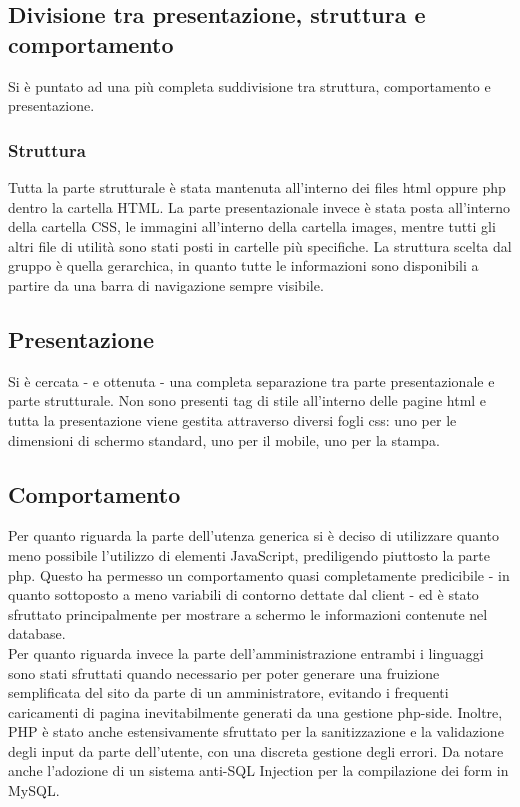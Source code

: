 \subsection{Divisione tra presentazione, struttura e comportamento}
Si è puntato ad una più completa suddivisione tra struttura, comportamento e presentazione.
\subsubsection{Struttura}
Tutta la parte strutturale è stata mantenuta all'interno dei files html oppure php dentro la cartella HTML. La parte presentazionale invece è stata posta all'interno della cartella CSS, le immagini all'interno della cartella images, mentre tutti gli altri file di utilità sono stati posti in cartelle più specifiche. La struttura scelta dal gruppo è quella gerarchica, in quanto tutte le informazioni sono disponibili a partire da una barra di navigazione sempre visibile.
\subsection{Presentazione}
Si è cercata - e ottenuta - una completa separazione tra parte presentazionale e parte strutturale. Non sono presenti tag di stile all'interno delle pagine html e tutta la presentazione viene gestita attraverso diversi fogli css: uno per le dimensioni di schermo standard, uno per il mobile, uno per la stampa.
\subsection{Comportamento}
Per quanto riguarda la parte dell'utenza generica si è deciso di utilizzare quanto meno possibile l'utilizzo di elementi JavaScript, prediligendo piuttosto la parte php. Questo ha permesso un comportamento quasi completamente predicibile - in quanto sottoposto a meno variabili di contorno dettate dal client - ed è stato sfruttato principalmente per mostrare a schermo le informazioni contenute nel database.
\\Per quanto riguarda invece la parte dell'amministrazione entrambi i linguaggi sono stati sfruttati quando necessario per poter generare una fruizione semplificata del sito da parte di un amministratore, evitando i frequenti caricamenti di pagina inevitabilmente generati da una gestione php-side. Inoltre, PHP è stato anche estensivamente sfruttato per la sanitizzazione e la validazione degli input da parte dell'utente, con una discreta gestione degli errori. Da notare anche l'adozione di un sistema anti-SQL Injection per la compilazione dei form in MySQL.
